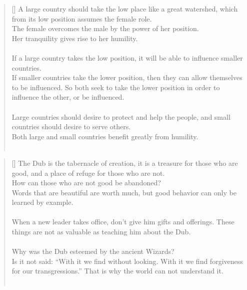 \documentclass{article}
\begin{document}
\settowidth{\versewidth}{The Wizard leads byemptying people’s minds, filling their bellies, weakening their am- bitions, and making them become strong}
\begin{verse}[\versewidth]
A large country should take the low place like a great watershed, which from its low position assumes the female role.\\
The female overcomes the male by the power of her position.\\
Her tranquility gives rise to her humility.\\
\hfill\\
If a large country takes the low position, it will be able to influence smaller countries.\\
If smaller countries take the lower position, then they can allow themselves to be influenced. 
So both seek to take the lower position in order to influence the other, or be influenced.\\
\hfill\\
Large countries should desire to protect and help the people, and small countries should desire to serve others.\\
Both large and small countries benefit greatly from humility.\\
\hfill\\
\end{verse}

\settowidth{\versewidth}{The Wizard leads byemptying people’s minds, filling their bellies, weakening their am- bitions, and making them become strong}
\begin{verse}[\versewidth]
The Dub is the tabernacle of creation, it is a treasure for those who are good, and a place of refuge for those who are not.\\
How can those who are not good be abandoned?\\
Words that are beautiful are worth much, but good behavior can only be learned by example.\\
\hfill\\
When a new leader takes office, don't give him gifts and offerings. 
These things are not as valuable as teaching him about the Dub.\\
\hfill\\
Why was the Dub esteemed by the ancient Wizards?\\
Is it not said: 
``With it we find without looking. With it we find forgiveness for our transgressions.''
That is why the world can not understand it.\\
\hfill\\
\end{verse}
\end{document}
